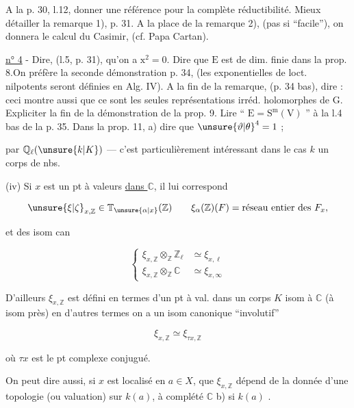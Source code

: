 A la p. 30, l.12, donner une référence pour la complète réductibilité. Mieux détailler la remarque 1), p. 31. A la place de la remarque 2), (pas si ``facile''), on donnera le calcul du Casimir, (cf. Papa Cartan).

\uline{n° 4} - Dire, (l.5, p. 31), qu'on a $\mathrm{x}^2=0$. Dire que $\mathrm{E}$ est de dim. finie dans la prop. 8.On préfère la seconde démonstration p. 34, (les exponentielles de loct. nilpotents seront définies en Alg. IV). A la fin de la remarque, (p. 34 bas), dire : ceci montre aussi que ce sont les seules représentations irréd. holomorphes de $\mathrm{G}$. Expliciter la fin de la démonstration de la prop. 9. Lire `` $\mathrm{E}=\mathrm{S}^{\mathrm m}(\mathrm{V})$ '' à la l.4 bas de la p. 35. Dans la prop. 11, a) dire que $\unsure{\vartheta|\theta}^4=1$ ;

par $\mathbb{Q}_{\ell}(\unsure{k|K})$ --- c’est particulièrement intéressant dans le cas $k$ un corps de nbs.

(iv) Si $x$ est un pt à valeurs \uline{dans $\mathbb{C}$}, il lui correspond

\[
\unsure{\xi|\zeta}_{x,\mathbb{Z}}\in\mathbb{T}_{\unsure{\alpha|x}}(\mathbb{Z})\qquad
\xi_{\alpha}(\mathbb{Z})(F)=\text{réseau entier des }F_x,
\]


et des isom can

\[
\left\{\begin{aligned}
\xi_{x,\mathbb{Z}}\otimes_{\mathbb{Z}}\mathbb{Z}_{\ell}&\simeq\xi_{x,\ell}\\
\xi_{x,\mathbb{Z}}\otimes_{\mathbb{Z}}\mathbb{C}&\simeq\xi_{x,\infty}
\end{aligned}\right.
\]

D’ailleurs $\xi_{x,\mathbb{Z}}$ est défini en termes d’un pt à val. dans un corps  $K$ isom à $\mathbb{C}$ (à isom  près) en d’autres termes on a un isom canonique ``involutif''

\[
\xi_{x,\mathbb{Z}}\simeq\xi_{\tau x,\mathbb{Z}}
\]

où $\tau x$ est le pt complexe conjugué.

 On peut dire aussi, si $x$ est localisé en $a\in X$, que  $\xi_{x,\mathbb{Z}}$ dépend de la donnée d’une topologie  (ou valuation) sur $k(a)$, à complété $\mathbb{C}$ \enspace b) si $k(a)$ .

